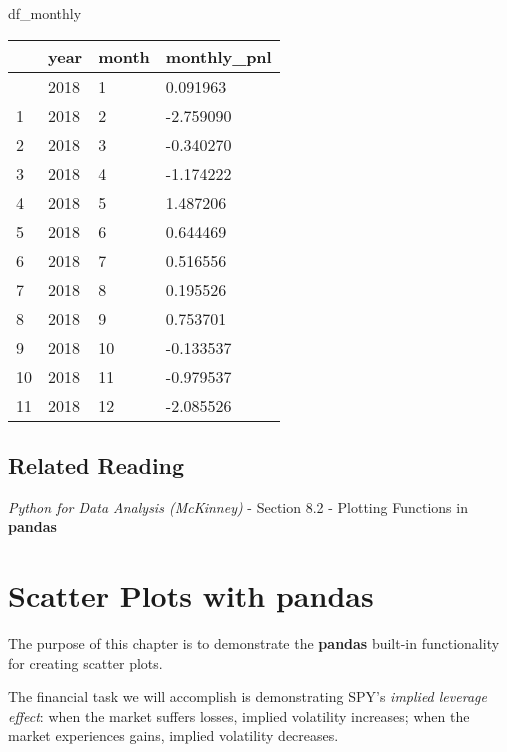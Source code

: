 \documentclass[
  letterpaper,
  DIV=11,
  numbers=noendperiod]{scrreprt}
\newenvironment{Shaded}{\begin{snugshade}}{\end{snugshade}}
\newcommand{\NormalTok}[1]{\textcolor[rgb]{0.00,0.23,0.31}{#1}}
\begin{document}
\begin{Shaded}
\begin{Highlighting}[]
\NormalTok{df\_monthly}
\end{Highlighting}
\end{Shaded}

\begin{longtable}[]{@{}llll@{}}
\toprule\noalign{}
& year & month & monthly\_pnl \\
\midrule\noalign{}
\endhead
\bottomrule\noalign{}
\endlastfoot
0 & 2018 & 1 & 0.091963 \\
1 & 2018 & 2 & -2.759090 \\
2 & 2018 & 3 & -0.340270 \\
3 & 2018 & 4 & -1.174222 \\
4 & 2018 & 5 & 1.487206 \\
5 & 2018 & 6 & 0.644469 \\
6 & 2018 & 7 & 0.516556 \\
7 & 2018 & 8 & 0.195526 \\
8 & 2018 & 9 & 0.753701 \\
9 & 2018 & 10 & -0.133537 \\
10 & 2018 & 11 & -0.979537 \\
11 & 2018 & 12 & -2.085526 \\
\end{longtable}

\hypertarget{related-reading-7}{%
\section{Related Reading}\label{related-reading-7}}

\emph{Python for Data Analysis (McKinney)} - Section 8.2 - Plotting
Functions in \textbf{pandas}

\hypertarget{scatter-plots-with-pandas}{%
\chapter{\texorpdfstring{Scatter Plots with
\textbf{pandas}}{Scatter Plots with pandas}}\label{scatter-plots-with-pandas}}

The purpose of this chapter is to demonstrate the \textbf{pandas}
built-in functionality for creating scatter plots.

The financial task we will accomplish is demonstrating SPY's
\emph{implied leverage effect}: when the market suffers losses, implied
volatility increases; when the market experiences gains, implied
volatility decreases.
\end{document}
